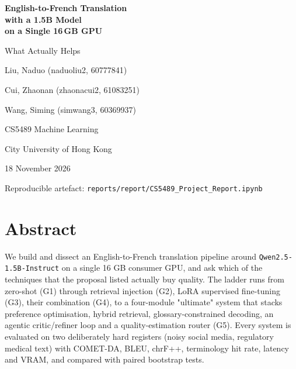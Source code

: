 \documentclass[a4paper,12pt,oneside]{article}
\begin{document}
\sloppy
\begin{titlepage}
\centering
\vspace*{0.15\textheight}
{\LARGE\bfseries English-to-French Translation\\[2pt]
with a 1.5B Model\\[2pt]
on a Single 16\,GB GPU\par}
\vspace{6mm}
{\large What Actually Helps\par}
\vspace{16mm}
{\large Liu, Naduo \quad (naduoliu2, 60777841)\par}
\vspace{2mm}
{\large Cui, Zhaonan \quad (zhaonacui2, 61083251)\par}
\vspace{2mm}
{\large Wang, Siming \quad (simwang3, 60369937)\par}
\vspace{10mm}
{\large CS5489 Machine Learning\par}
{\large City University of Hong Kong\par}
\vspace{10mm}
{\large 18 November 2026\par}
\vfill
{\small Reproducible artefact: \texttt{reports/report/CS5489\_Project\_Report.ipynb}}
\end{titlepage}
\tableofcontents
\newpage
\section*{Abstract}

We build and dissect an English-to-French translation pipeline around \texttt{Qwen2.5-1.5B-Instruct}
on a single 16 GB consumer GPU, and ask which of the techniques that the proposal listed
actually buy quality. The ladder runs from zero-shot (G1) through retrieval injection (G2),
LoRA supervised fine-tuning (G3), their combination (G4), to a four-module "ultimate" system
that stacks preference optimisation, hybrid retrieval, glossary-constrained decoding, an
agentic critic/refiner loop and a quality-estimation router (G5). Every system is evaluated on
two deliberately hard registers (noisy social media, regulatory medical text) with COMET-DA,
BLEU, chrF++, terminology hit rate, latency and VRAM, and compared with paired bootstrap
tests.
\end{document}
